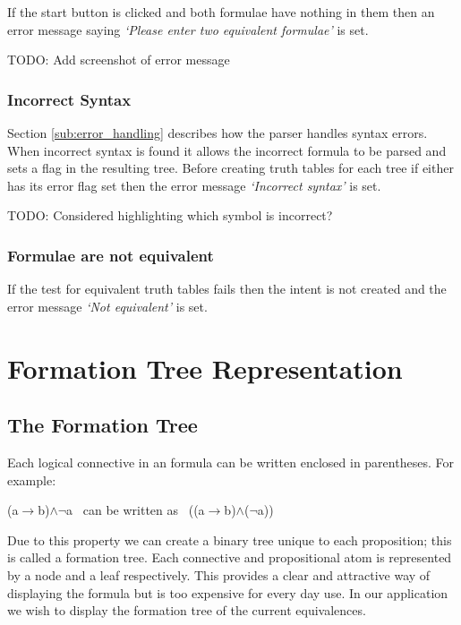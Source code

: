 \documentclass{report}
\begin{document}
If the start button is clicked and both formulae have nothing in them then an error message saying \textit{`Please enter two equivalent formulae'} is set.

TODO: Add screenshot of error message

\subsubsection{Incorrect Syntax}

Section \ref{sub:error_handling} describes how the parser handles syntax errors. When incorrect syntax is found it allows the incorrect formula to be parsed and sets a flag in the resulting tree. Before creating truth tables for each tree if either has its error flag set then the error message \textit{`Incorrect syntax'} is set.

TODO: Considered highlighting which symbol is incorrect?

\subsubsection{Formulae are not equivalent}

If the test for equivalent truth tables fails then the intent is not created and the error message \textit{`Not equivalent'} is set.

\section{Formation Tree Representation}
\label{sec:formation_tree_representation}

\subsection{The Formation Tree}

Each logical connective in an formula can be written enclosed in parentheses. For example:

\begin{center}
(a$\to$b)$\land$$\neg$a \ can be written as \ ((a$\to$b)$\land$($\neg$a))
\end{center}

Due to this property we can create a binary tree unique to each proposition; this is called a formation tree. Each connective and propositional atom is represented by a node and a leaf respectively. This provides a clear and attractive way of displaying the formula but is too expensive for every day use. In our application we wish to display the formation tree of the current equivalences.
\end{document}
